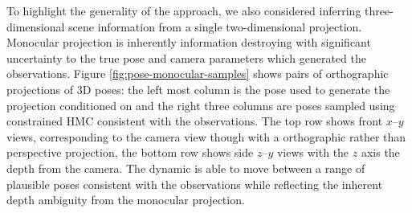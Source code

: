 To highlight the generality of the approach, we also considered inferring three-dimensional scene information from a single two-dimension\-al projection. Monocular projection is inherently information destroying with significant uncertainty to the true pose and camera parameters which generated the observations. Figure \ref{fig:pose-monocular-samples} shows pairs of orthographic projections of 3D poses: the left most column is the pose used to generate the projection conditioned on and the right three columns are poses sampled using constrained \ac{HMC} consistent with the observations. The top row shows front $x$--$y$ views, corresponding to the camera view though with a orthographic rather than perspective projection, the bottom row shows side $z$--$y$ views with the $z$ axis the depth from the camera. The dynamic is able to move between a range of plausible poses consistent with the observations while reflecting the inherent depth ambiguity from the monocular projection.

%
%
%
%
%

